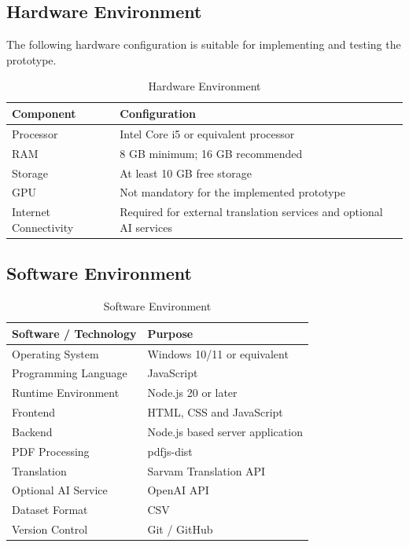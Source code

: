 \subsection{Hardware Environment}

The following hardware configuration is suitable for implementing and
testing the prototype.

\begin{table}[H]
\centering
\caption{Hardware Environment}
\begin{tabular}{|p{5cm}|p{8cm}|}
\hline
\textbf{Component} & \textbf{Configuration} \\
\hline
Processor & Intel Core i5 or equivalent processor \\
\hline
RAM & 8 GB minimum; 16 GB recommended \\
\hline
Storage & At least 10 GB free storage \\
\hline
GPU & Not mandatory for the implemented prototype \\
\hline
Internet Connectivity & Required for external translation services and optional AI services \\
\hline
\end{tabular}
\end{table}

\subsection{Software Environment}

\begin{table}[H]
\centering
\caption{Software Environment}
\begin{tabular}{|p{5cm}|p{8cm}|}
\hline
\textbf{Software / Technology} & \textbf{Purpose} \\
\hline
Operating System & Windows 10/11 or equivalent \\
\hline
Programming Language & JavaScript \\
\hline
Runtime Environment & Node.js 20 or later \\
\hline
Frontend & HTML, CSS and JavaScript \\
\hline
Backend & Node.js based server application \\
\hline
PDF Processing & pdfjs-dist \\
\hline
Translation & Sarvam Translation API \\
\hline
Optional AI Service & OpenAI API \\
\hline
Dataset Format & CSV \\
\hline
Version Control & Git / GitHub \\
\hline
\end{tabular}
\end{table}

